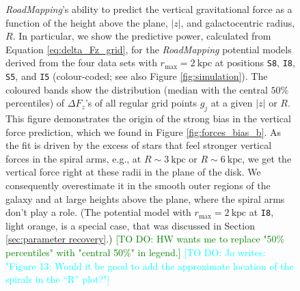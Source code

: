 \documentclass[iop,revtex4,numberedappendix,appendixfloats]{emulateapj}
\newcommand{\RM}{{\sl RoadMapping}}
\newcommand{\HW}[1]{\textcolor{Green}{#1}}
\newcommand{\Jo}[1]{\textcolor{Cyan}{#1}}
\begin{document}
\begin{figure}[!htbp]
\centering
\caption{\RM{}'s ability to predict the vertical gravitational force as a function of the height above the plane, $|z|$, and galactocentric radius, $R$. In particular, we show the predictive power, calculated from Equation \eqref{eq:delta_Fz_grid}, for the \RM{} potential models derived from the four data sets with $r_\text{max}=2~\text{kpc}$ at positions \texttt{S8}, \texttt{I8}, \texttt{S5}, and \texttt{I5} (colour-coded; see also Figure \ref{fig:simulation}). The coloured bands show the distribution (median with the central $50\%$ percentiles) of $\Delta F_z$'s of all regular grid points $g_j$ at a given $|z|$ or $R$. This figure demonstrates the origin of the strong bias in the vertical force prediction, which we found in Figure \ref{fig:forces_bias_b}. As the fit is driven by the excess of stars that feel stronger vertical forces in the spiral arms, e.g., at $R\sim3~\text{kpc}$ or $R\sim6~\text{kpc}$, we get the vertical force right at these radii in the plane of the disk. We consequently overestimate it in the smooth outer regions of the galaxy and at large heights above the plane, where the spiral arms don't play a role. (The potential model with $r_\text{max}=2~\text{kpc}$ at \texttt{I8}, light orange, is a special case, that was discussed in Section \ref{sec:parameter recovery}.) \HW{[TO DO: HW wants me to replace "50\% percentiles" with "central 50\%" in legend.]} \Jo{[TO DO: Jo writes: "Figure 13: Would it be good to add the approximate location of the
spirals in the “R” plot?"]}}
\label{fig:Fg_vs_z_and_R}
\end{figure}
\end{document}
